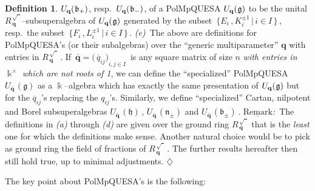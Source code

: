 \documentclass[12pt,reqno,twoside,a4paper]{amsart}
\numberwithin{equation}{section}
\theoremstyle{definition}
\newtheorem{definition}[lema]{Definition}
\newtheorem{free text}[lema]{}
\theoremstyle{remark}
\def \bq {\mathbf{q}}
\def \k {\Bbbk}
\def \Rbqsq {{R_{\,\bq}^{\,\scriptscriptstyle {\sqrt{\phantom{I}}}}}}
\def \lieg{\mathfrak{g}}
\def \lieb{\mathfrak{b}}
\def \lieh{\mathfrak{h}}
\def \lien{\mathfrak{n}}
\def \Ubqg {U_{\bq}(\hskip0,5pt\lieg)}
\def \Ubqbm {U_{\bq}(\hskip0,5pt\lieb_-)}
\def \Ubqbp {U_{\bq}(\hskip0,5pt\lieb_+)}
\theoremstyle{plain}
\begin{document}
\begin{definition}
   $ \Ubqbp $,  resp.\  $ \Ubqbm $,  of a PolMpQUESA  $ \Ubqg $
   to be the unital  $ \Rbqsq $--subsuperalgebra  of  $ \Ubqg $
   generated by the subset  $ \, \big\{ E_i \, , K_i^{\pm 1} \,\big|\, i \in I \,\big\} \, $,
   resp.\ the subset  $ \, \big\{ F_i \, , L_i^{\pm 1} \,\big|\, i \in I \,\big\} \, $.
%
 \vskip5pt
%
   {\it (e)}\,  The above are definitions for PolMpQUESA's (or their subalgebras)
   over the ``generic multiparameter''  $ \bq $  with entries in  $ \Rbqsq \, $.
   If  $ \, \overline{\bq} = {\big(\, \overline{q}_{ij} \big)}_{i , j \in I} \, $
   is any square matrix of size  $ n $  \textsl{with entries in
   $ \k^\times $  \textit{which are not roots of 1}},  we can define the
   ``specialized'' PolMpQUESA  $ U_{\overline{\bq}\,}(\lieg) $  as a  $ \k $--algebra
   which has exactly the same presentation of  $ \Ubqg $  but for the
   $ \overline{q}_{ij} $'s  replacing the  $ q_{ij} $'s.
   Similarly, we define ``specialized'' Cartan, nilpotent and
   Borel subsuperalgebras  $ U_{\overline{\bq}\,}(\lieh) \, $,
   $ U_{\overline{\bq}\,}(\lien_\pm) $  and  $ U_{\overline{\bq}\,}(\lieb_\pm) \, $.
%
 \vskip5pt
%
   \textit{$ \underline{\text{Remark}} $:}\,  The definitions in
   \textit{(a)\/}  through  \textit{(d)\/}  are given over the ground ring  $ \Rbqsq $
   that is the  \textsl{least\/}  one for which the definitions make sense.
   Another natural choice would be to pick as ground ring the field of fractions of  $ \Rbqsq \, $.
   The further results hereafter then still hold true, up to minimal adjustments.
   \hfill  $ \diamondsuit $
%
\end{definition}

\vskip7pt

   The key point about PolMpQUESA's is the following:

\vskip13pt
\end{document}
